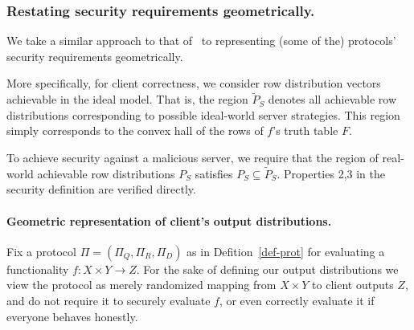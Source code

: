 \documentclass[a4paper]{article}
\newcommand{\R}{\mathbb{R}}
\begin{document}
\subsubsection{Restating security requirements geometrically.}

We take a similar approach to that of~\cite{Ash14} 
to representing (some of the) protocols' security requirements geometrically.


More specifically, for client correctness, we consider row distribution vectors achievable 
in the ideal model. That is, the region $\tilde{P}_S$ denotes all achievable row distributions corresponding to possible ideal-world server strategies.
This region simply corresponds to the convex hall of the rows of $f$'s 
truth table $F$.


To achieve security against a malicious server, we require that
the region of real-world achievable row distributions $P_S$ satisfies
$P_S\subseteq \tilde{P}_S$.
Properties 2,3 in the security definition are verified directly.


\paragraph{Geometric representation of client's output distributions.}
Fix a protocol $\Pi=(\Pi_Q,\Pi_R,\Pi_D)$
as in Defition~\ref{def-prot} for evaluating a functionality $f:X\times Y\rightarrow Z$. For the sake of defining our output distributions we view the protocol as merely randomized mapping from $X\times Y$ to client outputs $Z$, and do not require it to securely evaluate $f$, or even correctly evaluate it if everyone behaves honestly.
\end{document}
